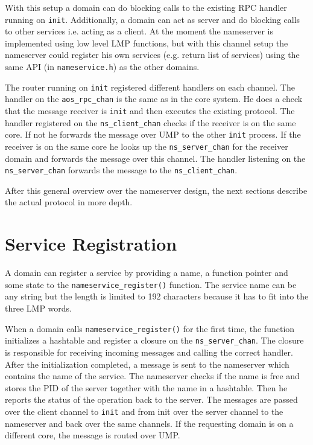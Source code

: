 With this setup a domain can do blocking calls to the existing RPC handler running on \verb|init|. Additionally, a domain can act
as server and do blocking calls to other services i.e. acting as a client. At the moment the nameserver is implemented using low 
level LMP functions, but with this channel setup the nameserver could register his own services (e.g. return list of services)
using the same API (in \verb|nameservice.h|) as the other domains.

The router running on \verb|init| registered different handlers on each channel. The handler on the \verb|aos_rpc_chan| is the
same as in the core system. He does a check that the message receiver is \verb|init| and then executes the existing protocol.
The handler registered on the \verb|ns_client_chan| checks if the receiver is on the same core. If not he forwards the message
over UMP to the other \verb|init| process. If the receiver is on the same core he looks up the \verb|ns_server_chan| for the
receiver domain and forwards the message over this channel. The handler listening on the \verb|ns_server_chan| forwards the
message to the \verb|ns_client_chan|.

After this general overview over the nameserver design, the next sections describe the actual protocol in more depth.

\section{Service Registration}

A domain can register a service by providing a name, a function pointer and some state to the \verb|nameservice_register()| function.
The service name can be any string but the length is limited to 192 characters because it has to fit into the three LMP words.

When a domain calls \verb|nameservice_register()| for the first time, the function initializes a hashtable and register a closure
on the \verb|ns_server_chan|. The closure is responsible for receiving incoming messages and calling the correct handler. After
the initialization completed, a message is sent to the nameserver which contains the name of the service. The nameserver checks
if the name is free and stores the PID of the server together with the name in a hashtable. Then he reports the status of the 
operation back to the server. The messages are passed over the client channel to \verb|init| and from init over the server channel
to the nameserver and back over the same channels. If the requesting domain is on a different core, the message is routed over UMP.


